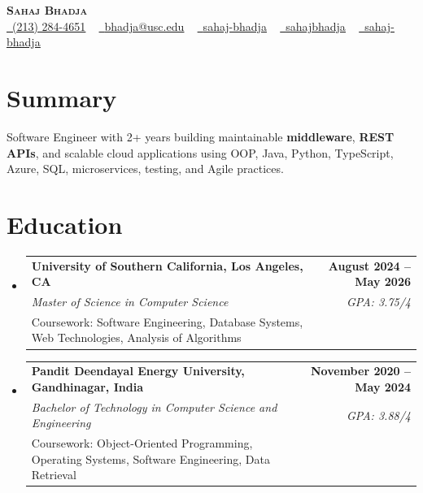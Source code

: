 \documentclass[letterpaper,10pt]{article}
\makeatletter
\newcommand{\sectionGap}{\vspace{-8pt}}
\newcommand{\resumeEduSubheading}[5]{\vspace{-1pt}\item\begin{tabular*}{1.0\textwidth}[t]{l@{\extracolsep{\fill}}r}\textbf{#1} & \textbf{\small #2} \\\textit{\small #3} & \textit{\small #4} \\\small #5 & \\\end{tabular*}\vspace{-4pt}}
\newcommand{\resumeSubHeadingListStart}{\begin{itemize}[leftmargin=0.0in, label={}]}
\newcommand{\resumeSubHeadingListEnd}{\end{itemize}}
\makeatother
\begin{document}
\begin{center}
{\Huge \scshape \textbf{Sahaj Bhadja}} \\ \vspace{1pt}
\small \href{tel:2132844651}{\faPhone\ \underline{(213) 284-4651}} ~ \href{mailto:bhadja@usc.edu}{\raisebox{-0.2\height}\faEnvelope\ \underline{bhadja@usc.edu}} ~
\href{https://www.linkedin.com/in/sahaj-bhadja/}{\raisebox{-0.2\height}\faLinkedin\ \underline{sahaj-bhadja}} ~ \href{https://github.com/SAHAJ-BHADJA}{\raisebox{-0.2\height}\faGithub\ \underline{sahajbhadja}} ~
\href{https://sahaj-bhadja.vercel.app/}{\raisebox{-0.2\height}\faGlobe\ \underline{sahaj-bhadja}}
\end{center}
\vspace{-16pt}
\section{Summary}
\begin{itemize}[leftmargin=0.15in, label={}]
\small{\item{Software Engineer with 2+ years building maintainable \textbf{middleware}, \textbf{REST APIs}, and scalable cloud applications using OOP, Java, Python, TypeScript, Azure, SQL, microservices, testing, and Agile practices.}}
\end{itemize}
\sectionGap
\section{Education}
\resumeSubHeadingListStart
\resumeEduSubheading{University of Southern California, Los Angeles, CA}{August 2024 -- May 2026}{Master of Science in Computer Science}{GPA: 3.75/4}{Coursework: Software Engineering, Database Systems, Web Technologies, Analysis of Algorithms}
\resumeEduSubheading{Pandit Deendayal Energy University, Gandhinagar, India}{November 2020 -- May 2024}{Bachelor of Technology in Computer Science and Engineering}{GPA: 3.88/4}{Coursework: Object-Oriented Programming, Operating Systems, Software Engineering, Data Retrieval}
\resumeSubHeadingListEnd
\sectionGap
\end{document}
